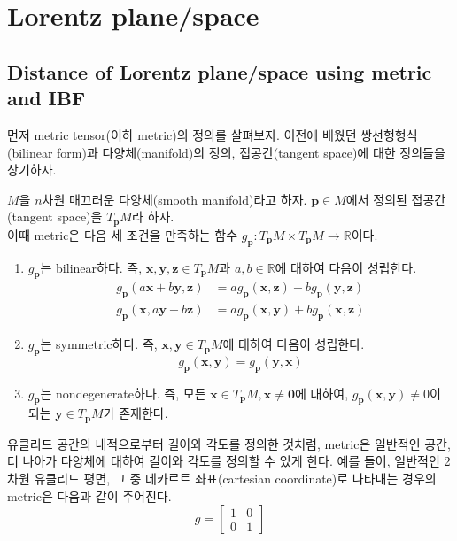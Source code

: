 \documentclass[10pt,a4paper]{article}
\begin{document}
\newpage
\section{Lorentz plane/space}
\subsection{Distance of Lorentz plane/space using metric and IBF}
먼저 metric tensor(이하 metric)의 정의를 살펴보자. 이전에 배웠던 쌍선형형식(bilinear form)과 다양체(manifold)의 정의, 접공간(tangent space)에 대한 정의들을 상기하자.
\begin{tcolorbox}[title=Metric]
$M$을 $n$차원 매끄러운 다양체(smooth manifold)라고 하자. $\mathbf{p} \in M$에서 정의된 접공간(tangent space)을 $T_{\mathbf{p}}M$라 하자.\\
이때 metric은 다음 세 조건을 만족하는 함수 $g_{\mathbf{p}} : T_{\mathbf{p}}M \times T_{\mathbf{p}}M \to \mathbb{R}$이다.
\begin{enumerate}
\item $g_{\mathbf{p}}$는 bilinear하다. 즉, $\mathbf{x}, \mathbf{y}, \mathbf{z} \in T_{\mathbf{p}}M$과 $a, b \in \mathbb{R}$에 대하여 다음이 성립한다.
\begin{align*}
    g_{\mathbf{p}}(a\mathbf{x}+b\mathbf{y}, \mathbf{z}) &= ag_{\mathbf{p}}(\mathbf{x}, \mathbf{z}) + bg_{\mathbf{p}}(\mathbf{y}, \mathbf{z}) \\
    g_{\mathbf{p}}(\mathbf{x}, a\mathbf{y} + b\mathbf{z}) &= ag_{\mathbf{p}}(\mathbf{x}, \mathbf{y}) + bg_{\mathbf{p}}(\mathbf{x}, \mathbf{z})
\end{align*}
\item $g_{\mathbf{p}}$는 symmetric하다. 즉, $\mathbf{x}, \mathbf{y} \in T_{\mathbf{p}}M$에 대하여 다음이 성립한다.
\[ g_{\mathbf{p}}(\mathbf{x}, \mathbf{y}) = g_{\mathbf{p}}(\mathbf{y}, \mathbf{x}) \]
\item $g_{\mathbf{p}}$는 nondegenerate하다. 즉, 모든 $\mathbf{x} \in T_{\mathbf{p}}M, \mathbf{x} \neq \mathbf{0}$에 대하여, $g_{\mathbf{p}}(\mathbf{x}, \mathbf{y}) \neq 0$이 되는 $\mathbf{y} \in T_{\mathbf{p}}M$가 존재한다.
\end{enumerate}
\end{tcolorbox}
유클리드 공간의 내적으로부터 길이와 각도를 정의한 것처럼, metric은 일반적인 공간, 더 나아가 다양체에 대하여 길이와 각도를 정의할 수 있게 한다.
예를 들어, 일반적인 2차원 유클리드 평면, 그 중 데카르트 좌표(cartesian coordinate)로 나타내는 경우의 metric은 다음과 같이 주어진다.
\[g = \begin{bmatrix}1&0\\0&1\end{bmatrix}\]
\end{document}

